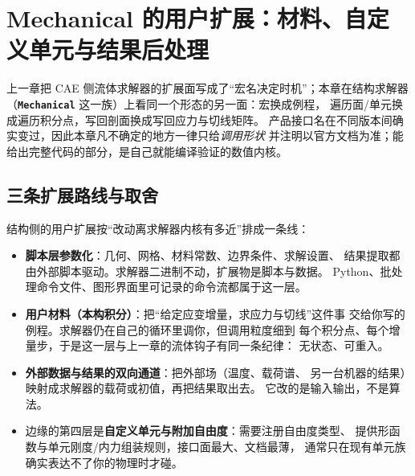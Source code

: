 \documentclass[12pt,a4paper,fontset=fandol]{ctexbook}
\newcommand{\Lib}[1]{\textbf{\texttt{#1}}}
\newcommand{\Lang}[1]{\textsf{#1}}
\newcommand{\PY}{\Lang{Python}}
\newcommand{\DomCAE}{\Lang{CAE}}
\begin{document}
\chapter{Mechanical 的用户扩展：材料、自定义单元与结果后处理}
\label{ch:ch04-mechanical-ext}

上一章把 \DomCAE{} 侧流体求解器的扩展面写成了``宏名决定时机''；本章在结构求解器
（\Lib{Mechanical} 这一族）上看同一个形态的另一面：宏换成例程，
遍历面/单元换成遍历积分点，写回剖面换成写回应力与切线矩阵。
产品接口名在不同版本间确实变过，因此本章凡不确定的地方一律只给\emph{调用形状}
并注明以官方文档为准；能给出完整代码的部分，是自己就能编译验证的数值内核。

\section{三条扩展路线与取舍}
\label{sec:ch04-routes}

结构侧的用户扩展按``改动离求解器内核有多近''排成一条线：

\begin{itemize}
  \item \textbf{脚本层参数化}：几何、网格、材料常数、边界条件、求解设置、
        结果提取都由外部脚本驱动。求解器二进制不动，扩展物是脚本与数据。
        \PY{}、批处理命令文件、图形界面里可记录的命令流都属于这一层。
  \item \textbf{用户材料（本构积分）}：把``给定应变增量，求应力与切线''这件事
        交给你写的例程。求解器仍在自己的循环里调你，但调用粒度细到
        每个积分点、每个增量步，于是这一层与上一章的流体钩子有同一条纪律：
        无状态、可重入。
  \item \textbf{外部数据与结果的双向通道}：把外部场（温度、载荷谱、
        另一台机器的结果）映射成求解器的载荷或初值，再把结果取出去。
        它改的是输入输出，不是算法。
  \item 边缘的第四层是\textbf{自定义单元与附加自由度}：需要注册自由度类型、
        提供形函数与单元刚度/内力组装规则，接口面最大、文档最薄，
        通常只在现有单元族确实表达不了你的物理时才碰。
\end{itemize}
\end{document}

